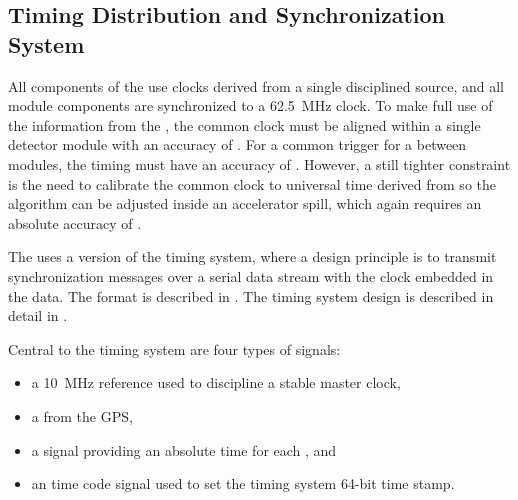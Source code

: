 \subsection{Timing Distribution and Synchronization System}
\label{sec:sp-daq:design-timing}

All components of the  use clocks derived from a single  disciplined source, and all module components are synchronized to a \SI{62.5}{MHz} clock. 
To make full use of the information from the , the common clock must be aligned within a single detector %
module with an accuracy of . 
For a common trigger for a  between modules, the timing must have an accuracy of .
However, a still tighter constraint is the need to calibrate the common clock to universal time derived from  so the  algorithm can be adjusted inside an accelerator spill, which again requires an absolute accuracy of .

The   uses a version of the  timing
system, where a design principle is to transmit synchronization messages over
a serial data stream with the clock embedded in the data. The format
is described in . The timing system design is
described in detail in .

Central to the timing system are four types of signals:
\begin{itemize}
\item a \SI{10}{\mega\hertz} reference used to discipline a stable master clock,
\item a  from the GPS,
\item a  signal providing an absolute time for each , and
\item an  time code signal
  used to set the timing system 64-bit time stamp.
\end{itemize}

